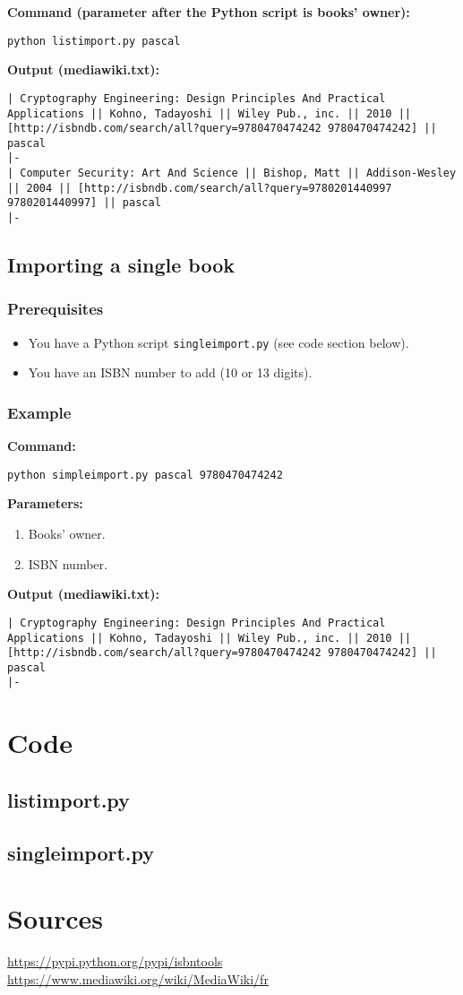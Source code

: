 \documentclass[a4paper,11pt]{article}
\begin{document}
\noindent \textbf{Command (parameter after the Python script is books' owner):}
\begin{lstlisting}
python listimport.py pascal
\end{lstlisting}

\noindent \textbf{Output (mediawiki.txt):}
\begin{lstlisting}
| Cryptography Engineering: Design Principles And Practical Applications || Kohno, Tadayoshi || Wiley Pub., inc. || 2010 || [http://isbndb.com/search/all?query=9780470474242 9780470474242] || pascal
|-
| Computer Security: Art And Science || Bishop, Matt || Addison-Wesley || 2004 || [http://isbndb.com/search/all?query=9780201440997 9780201440997] || pascal
|-
\end{lstlisting}
\newpage
\subsection{Importing a single book}
\subsubsection{Prerequisites}
\begin{itemize}
\item You have a Python script \texttt{singleimport.py} (see code section below). 
\item You have an ISBN number to add (10 or 13 digits).
\end{itemize}
\subsubsection{Example}
\textbf{Command:}
\begin{lstlisting}
python simpleimport.py pascal 9780470474242 
\end{lstlisting}

\noindent \textbf{Parameters:}
\begin{enumerate}
\item Books' owner.
\item ISBN number.
\end{enumerate}   

\noindent \textbf{Output (mediawiki.txt):}
\begin{lstlisting}
| Cryptography Engineering: Design Principles And Practical Applications || Kohno, Tadayoshi || Wiley Pub., inc. || 2010 || [http://isbndb.com/search/all?query=9780470474242 9780470474242] || pascal
|-
\end{lstlisting}
\newpage
\section{Code}
\subsection{listimport.py}

\subsection{singleimport.py}

\section{Sources}
\url{https://pypi.python.org/pypi/isbntools}\\
\url{https://www.mediawiki.org/wiki/MediaWiki/fr}
\end{document}
